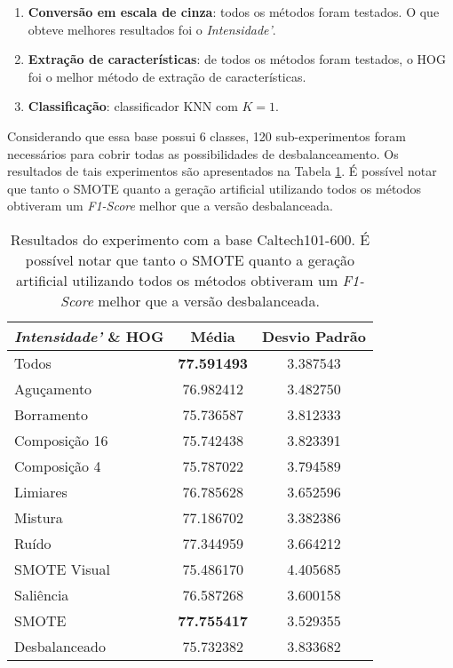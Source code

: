 \begin{enumerate}
\item \textbf{Conversão em escala de cinza}: todos os métodos foram testados. O que obteve melhores resultados foi o \textit{Intensidade'}.
\item \textbf{Extração de características}: de todos os métodos foram testados, o HOG foi o melhor método de extração de características.
\item \textbf{Classificação}: classificador KNN com $K=1$.
\end{enumerate}


Considerando que essa base possui 6 classes, 120 sub-experimentos foram necessários para cobrir todas as possibilidades de desbalanceamento. Os resultados de tais experimentos são apresentados na Tabela \ref{tab:resultados:3.2}. É possível notar que tanto o SMOTE quanto a geração artificial utilizando todos os métodos obtiveram um \textit{F1-Score} melhor que a versão desbalanceada.

\begin{table}[!htbp]
\begin{center}
\caption{Resultados do experimento com a base Caltech101-600. É possível notar que tanto o SMOTE quanto a geração artificial utilizando todos os métodos obtiveram um \textit{F1-Score} melhor que a versão desbalanceada.}
\label{tab:resultados:3.2}
\begin{tabular}{|l|c|c|}
\hline
\textbf{\emph{Intensidade'} \& HOG} & \textbf{Média} & \textbf{Desvio Padrão} \\ \hline
   Todos        &  \textbf{77.591493} &  3.387543  \\ \hline
  Aguçamento    &  76.982412 &  3.482750  \\ \hline
  Borramento    &  75.736587 &  3.812333  \\ \hline
  Composição 16 &  75.742438 &  3.823391  \\ \hline
  Composição 4  &  75.787022 &  3.794589  \\ \hline
  Limiares      &  76.785628 &  3.652596  \\ \hline
  Mistura       &  77.186702 &  3.382386  \\ \hline
  Ruído         &  77.344959 &  3.664212  \\ \hline
  SMOTE Visual  &  75.486170 &  4.405685  \\ \hline
  Saliência     &  76.587268 &  3.600158  \\ \hline
 SMOTE          &  \textbf{77.755417} &  3.529355  \\ \hline
Desbalanceado   &  75.732382 &  3.833682  \\ \hline
\end{tabular}
\end{center}
\end{table}

